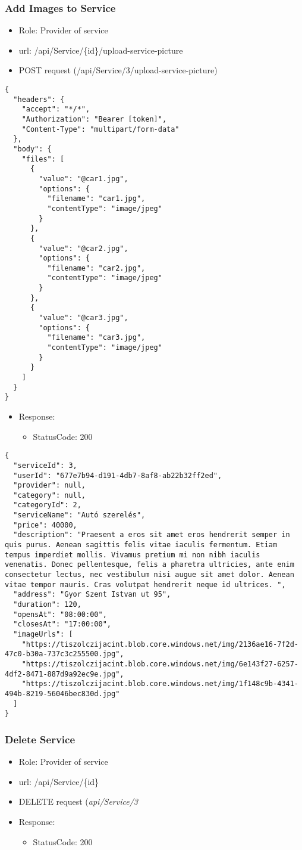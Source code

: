 \documentclass[11pt]{article}
\begin{document}
\subsubsection{Add Images to Service}
\label{sec:org15c0562}
\begin{itemize}
\item Role: Provider of service
\item url: /api/Service/\{id\}/upload-service-picture
\item POST request (/api/Service/3/upload-service-picture)
\end{itemize}
\begin{verbatim}
{
  "headers": {
    "accept": "*/*",
    "Authorization": "Bearer [token]",
    "Content-Type": "multipart/form-data"
  },
  "body": {
    "files": [
      {
        "value": "@car1.jpg",
        "options": {
          "filename": "car1.jpg",
          "contentType": "image/jpeg"
        }
      },
      {
        "value": "@car2.jpg",
        "options": {
          "filename": "car2.jpg",
          "contentType": "image/jpeg"
        }
      },
      {
        "value": "@car3.jpg",
        "options": {
          "filename": "car3.jpg",
          "contentType": "image/jpeg"
        }
      }
    ]
  }
}

\end{verbatim}
\begin{itemize}
\item Response:
\begin{itemize}
\item StatusCode: 200
\end{itemize}
\end{itemize}
\begin{verbatim}
{
  "serviceId": 3,
  "userId": "677e7b94-d191-4db7-8af8-ab22b32ff2ed",
  "provider": null,
  "category": null,
  "categoryId": 2,
  "serviceName": "Autó szerelés",
  "price": 40000,
  "description": "Praesent a eros sit amet eros hendrerit semper in quis purus. Aenean sagittis felis vitae iaculis fermentum. Etiam tempus imperdiet mollis. Vivamus pretium mi non nibh iaculis venenatis. Donec pellentesque, felis a pharetra ultricies, ante enim consectetur lectus, nec vestibulum nisi augue sit amet dolor. Aenean vitae tempor mauris. Cras volutpat hendrerit neque id ultrices. ",
  "address": "Gyor Szent Istvan ut 95",
  "duration": 120,
  "opensAt": "08:00:00",
  "closesAt": "17:00:00",
  "imageUrls": [
    "https://tiszolczijacint.blob.core.windows.net/img/2136ae16-7f2d-47c0-b30a-737c3c255500.jpg",
    "https://tiszolczijacint.blob.core.windows.net/img/6e143f27-6257-4df2-8471-887d9a92ec9e.jpg",
    "https://tiszolczijacint.blob.core.windows.net/img/1f148c9b-4341-494b-8219-56046bec830d.jpg"
  ]
}
\end{verbatim}
\subsubsection{Delete Service}
\label{sec:org2eb94b8}
\begin{itemize}
\item Role: Provider of service
\item url: /api/Service/\{id\}
\item DELETE request (\emph{api/Service/3}
\item Response:
\begin{itemize}
\item StatusCode: 200
\end{itemize}
\end{itemize}
\end{document}
